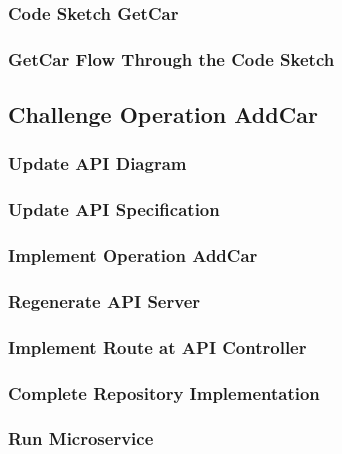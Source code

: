 \subsubsection*{Code Sketch GetCar}
\subsubsection*{GetCar Flow Through the Code Sketch}

\subsection{Challenge Operation AddCar}
\subsubsection*{Update API Diagram}
\subsubsection*{Update API Specification}
\subsubsection*{Implement Operation AddCar}
\subsubsection*{Regenerate API Server}
\subsubsection*{Implement Route at API Controller}
\subsubsection*{Complete Repository Implementation}
\subsubsection*{Run Microservice}